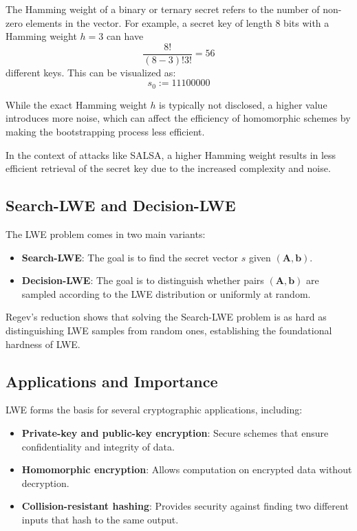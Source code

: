 \documentclass{article}
\begin{document}
The Hamming weight of a binary or ternary secret refers to the number of non-zero elements in the vector. For example, a secret key of length 8 bits with a Hamming weight \( h = 3 \) can have 
\[
\frac{8!}{(8-3)!3!} = 56
\]
different keys. This can be visualized as:
\[ s_0 := 11100000 \]

While the exact Hamming weight \( h \) is typically not disclosed, a higher value introduces more noise, which can affect the efficiency of homomorphic schemes by making the bootstrapping process less efficient.

In the context of attacks like SALSA, a higher Hamming weight results in less efficient retrieval of the secret key due to the increased complexity and noise.

\subsection{Search-LWE and Decision-LWE}
The LWE problem comes in two main variants:
\begin{itemize}
    \item \textbf{Search-LWE}: The goal is to find the secret vector \( s \) given \( (\mathbf{A}, \mathbf{b}) \).
    \item \textbf{Decision-LWE}: The goal is to distinguish whether pairs \( (\mathbf{A}, \mathbf{b}) \) are sampled according to the LWE distribution or uniformly at random.
\end{itemize}

Regev's reduction shows that solving the Search-LWE problem is as hard as distinguishing LWE samples from random ones, establishing the foundational hardness of LWE.

\subsection{Applications and Importance}
LWE forms the basis for several cryptographic applications, including:
\begin{itemize}
    \item \textbf{Private-key and public-key encryption}: Secure schemes that ensure confidentiality and integrity of data.
    \item \textbf{Homomorphic encryption}: Allows computation on encrypted data without decryption.
    \item \textbf{Collision-resistant hashing}: Provides security against finding two different inputs that hash to the same output.
\end{itemize}
\end{document}
